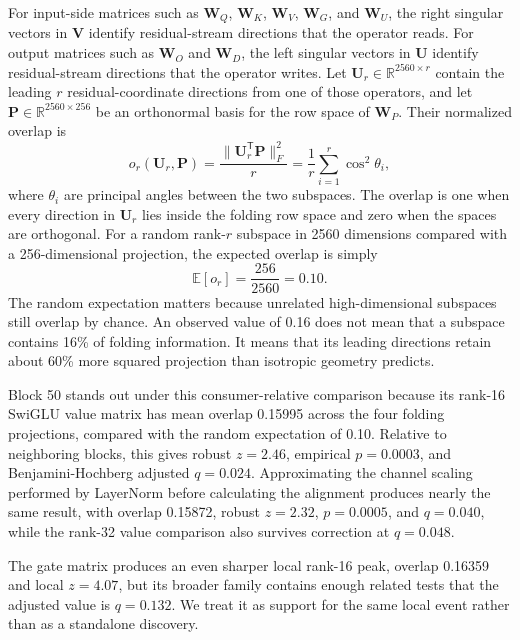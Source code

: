 \documentclass[11pt]{article}
\newcommand{\R}{\mathbb{R}}
\newcommand{\mat}[1]{\mathbf{#1}}
\begin{document}
For input-side matrices such as $\mat{W}_Q$, $\mat{W}_K$, $\mat{W}_V$, $\mat{W}_G$, and $\mat{W}_U$, the right singular vectors in $\mat{V}$ identify residual-stream directions that the operator reads. For output matrices such as $\mat{W}_O$ and $\mat{W}_D$, the left singular vectors in $\mat{U}$ identify residual-stream directions that the operator writes. Let $\mat{U}_r\in\R^{2560\times r}$ contain the leading $r$ residual-coordinate directions from one of those operators, and let $\mat{P}\in\R^{2560\times256}$ be an orthonormal basis for the row space of $\mat{W}_P$. Their normalized overlap is
\begin{equation}
o_r(\mat{U}_r,\mat{P})
=\frac{\|\mat{U}_r^{\mathsf T}\mat{P}\|_F^2}{r}
=\frac{1}{r}\sum_{i=1}^{r}\cos^2\theta_i,
\label{eq:overlap}
\end{equation}
where $\theta_i$ are principal angles between the two subspaces. The overlap is one when every direction in $\mat{U}_r$ lies inside the folding row space and zero when the spaces are orthogonal. For a random rank-$r$ subspace in 2560 dimensions compared with a 256-dimensional projection, the expected overlap is simply
\begin{equation}
\mathbb{E}[o_r]=\frac{256}{2560}=0.10.
\end{equation}
The random expectation matters because unrelated high-dimensional subspaces still overlap by chance. An observed value of 0.16 does not mean that a subspace contains 16\% of folding information. It means that its leading directions retain about 60\% more squared projection than isotropic geometry predicts.

Block 50 stands out under this consumer-relative comparison because its rank-16 SwiGLU value matrix has mean overlap 0.15995 across the four folding projections, compared with the random expectation of 0.10. Relative to neighboring blocks, this gives robust $z=2.46$, empirical $p=0.0003$, and Benjamini-Hochberg adjusted $q=0.024$. Approximating the channel scaling performed by LayerNorm before calculating the alignment produces nearly the same result, with overlap 0.15872, robust $z=2.32$, $p=0.0005$, and $q=0.040$, while the rank-32 value comparison also survives correction at $q=0.048$.

The gate matrix produces an even sharper local rank-16 peak, overlap 0.16359 and local $z=4.07$, but its broader family contains enough related tests that the adjusted value is $q=0.132$. We treat it as support for the same local event rather than as a standalone discovery.
\end{document}
